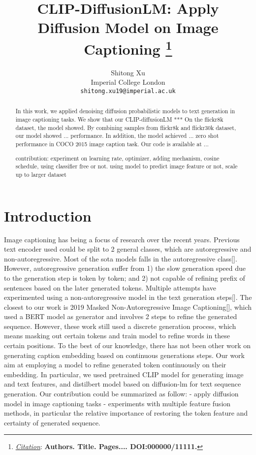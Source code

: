 \documentclass{article}
\title{CLIP-DiffusionLM: Apply Diffusion Model on Image Captioning
\thanks{\textit{\underline{Citation}}: 
\textbf{Authors. Title. Pages.... DOI:000000/11111.}} 
}
\author{
  Shitong Xu \\
  Imperial College London \\
  \texttt{shitong.xu19@imperial.ac.uk} \\
}
\begin{document}
\maketitle


\begin{abstract}
In this work, we applied denoising diffusion probabilistic models to text generation in image captioning tasks. We show that our CLIP-diffusionLM *** On the flickr8k dataset, the model showed. By combining samples from flickr8k and flickr30k dataset, our model showed ... performance. In addition, the model achieved ... zero shot performance in COCO 2015 image caption task. Our code is available at ...

contribution: experiment on learning rate, optimizer, adding mechanism, cosine schedule, using classifier free or not. using model to predict image feature or not, scale up to larger dataset
\end{abstract}




\section{Introduction}
Image captioning has being a focus of research over the recent years. Previous text encoder used could be split to 2 general classes, which are autoregressive and non-autoregressive. Most of the sota models falls in the autoregressive class[]. However, autoregressive generation suffer from 1) the slow generation speed due to the generation step is token by token; and 2) not capable of refining prefix of sentences based on the later generated tokens. Multiple attempts have experimented using a non-autoregressive model in the text generation steps[]. The closest to our work is 2019 Masked Non-Autoregressive Image Captioning[], which used a BERT model as generator and involves 2 steps to refine the generated sequence. However, these work still used a discrete generation process, which means masking out certain tokens and train model to refine words in these certain positions. To the best of our knowledge, there has not been other work on generating caption embedding based on continuous generations steps. Our work aim at employing a model to refine generated token continuously on their embedding. In particular, we used pretrained CLIP model for generating image and text features, and distilbert model based on diffusion-lm for text sequence generation. Our contribution could be summarized as follow:
  - apply diffusion model in image captioning tasks 
  - experiments with multiple feature fusion methods, in particular the relative importance of restoring the token feature and certainty of generated sequence.
\end{document}
